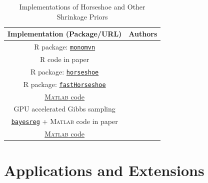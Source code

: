 \documentclass[11pt]{article}
\numberwithin{equation}{section}
\begin{document}
\begin{table}[htbp]
  \centering
  \caption{Implementations of Horseshoe and Other Shrinkage Priors}
  \footnotesize{
    \begin{tabular}{|c|c|}
    \hline
    Implementation (Package/URL) & Authors \bigstrut\\
    \hline
    \textsc{R} package: \href{https://cran.r-project.org/web/packages/monomvn/index.html}{\texttt{monomvn}} & \citet{gramacy2010shrinkage} \bigstrut[t]\\
     \textsc{R} code in paper & \citet{scott_parameter_2010} \\
    \textsc{R} package: \href{https://cran.r-project.org/web/packages/horseshoe/index.html}{\texttt{horseshoe}} & \citet{pas_horseshoe:_2016} \\
    \textsc{R} package: \href{https://cran.r-project.org/web/packages/fastHorseshoe/index.html}{\texttt{fastHorseshoe}} & \citet{hahn_elliptical_2016} \\
    \href{https://github.com/antik015/Fast-Sampling-of-Gaussian-Posteriors}{\textsc{Matlab} code} & \citet{bhattacharya_fast_2015} \\
    GPU accelerated Gibbs sampling & \citet{terenin_gpu-accelerated_2016} \\
    \href{https://cran.r-project.org/web/packages/bayesreg/index.html}{\texttt{bayesreg}} + \textsc{Matlab} code in paper & \citet{makalic2016high} \\
     \href{https://github.com/jamesjohndrow/horseshoe_jo}{\textsc{Matlab} code} & \citet{james2017scalable} \bigstrut[b]\\ 
    \hline
    \end{tabular}%
    }
  \label{tab:hs-imp}%
\end{table}%




\section{Applications and Extensions}\label{sec:app-ext}

\end{document}
